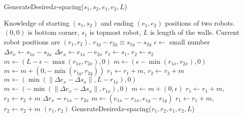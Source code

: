 \begin{algorithm}
\caption{GenerateDesired$x$-spacing($s_1,s_2,e_1,e_2,L$)}\label{alg:XControl}
\begin{algorithmic}[1]
\Require Knowledge of starting $(s_1,s_2)$ and ending $(e_1,e_2)$ positions of  two robots. 
$(0,0)$ is bottom corner, $s_1$ is topmost robot, 
 $L$ is length of the walls. Current robot positions are $(r_1,r_2)$.
\Ensure   $ r_{1y} - r_{2y}  \equiv s_{1y} - s_{2y} $   %
\State $\epsilon \gets $ small number
\State $ \Delta s_x  \gets s_{1x} - s_{2x} $
\State $ \Delta e_x \gets e_{1x} - e_{2x} $
\State $ r_1 \gets s_1$, $ r_2 \gets s_2$
\State $ m \gets ( L-\epsilon-\max( r_{1x},r_{2x}) ,0)   $ 
\Else 
\State  $ m \gets ( \epsilon-\min( r_{1x},r_{2x}),0 )    $ 
\EndIf
\State $m  \gets  m + (0, -\min( r_{1y},r_{2y} ))$ 
\State $ r_1 \gets r_1+m$, $ r_2 \gets r_2+m$ 
\State $ m \gets (\min(\|\Delta e_x - \Delta s_x \|, L- r_{1x}), 0)$  
\Else
\State $ m \gets (-\min(\|\Delta e_x - \Delta s_x \|, r_{1x}), 0)$
\EndIf 
\State $m  \gets  m + (0, \epsilon)$ 
\State $ r_1 \gets r_1+m$, $ r_2 \gets r_2+m$ 
\State $\Delta r_x = r_{1x} - r_{2x}$
\State   $ m \gets (e_{1x}-r_{1x}, e_{1y}-r_{1y})$
\State $ r_1 \gets r_1+m$, $ r_2 \gets r_2+m$ 
\State  \Return $(r_1,r_2)$
\Else   
\State \Return GenerateDesired$x$-spacing($r_1,r_2,e_1,e_2,L$)
\EndIf
\end{algorithmic}
\end{algorithm}

